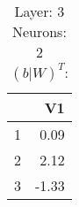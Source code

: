 \begin{table}[ht]
\centering
\begin{tabular}{rr}
  \hline
 & V1 \\ 
  \hline
1 & 0.09 \\ 
  2 & 2.12 \\ 
  3 & -1.33 \\ 
   \hline
\end{tabular}
\caption{Layer: 3 Neurons: 2  $(b|W)^T$: 
} 
\end{table}
